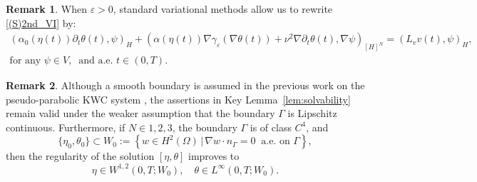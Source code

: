 \documentclass{sinst}
\numberwithin{equation}{section}
\theoremstyle{plain}
\theoremstyle{definition}
\newtheorem{rem}{Remark}
\begin{document}
\begin{rem}
  When $\varepsilon > 0$, standard variational methods allow us to rewrite \eqref{(S)2nd_VI} by:
  \begin{gather}
    (\alpha_0(\eta(t)) \partial_t \theta(t), \psi)_H + (\alpha(\eta(t)) \nabla \gamma_\varepsilon(\nabla \theta(t)) + \nu^2 \nabla \partial_t \theta(t), \nabla \psi)_{[H]^N} = (L_v v(t), \psi)_H,
    \\
    \mbox{for any } \psi \in V, \ \mbox{ and a.e. } t \in (0,T). 
  \end{gather}
\end{rem}

\begin{rem}
  Although a smooth boundary is assumed in the previous work on the pseudo-parabolic KWC system \cite{mizuno2024weak}, the assertions in Key Lemma~\ref{lem:solvability} remain valid under the weaker assumption that the boundary $\Gamma$ is Lipschitz continuous. Furthermore, if $N \in {1,2,3}$, the boundary $\Gamma$ is of class $C^4$, and 
  \begin{equation}
  \{ \eta_0, \theta_0 \} \subset W_0 := \left\{ w \in H^2(\Omega) \,|\, \nabla w \cdot n_\Gamma = 0 \ \mbox{ a.e. on } \Gamma \right\},
  \end{equation}
  then the regularity of the solution $[\eta, \theta]$ improves to
  \begin{equation}
    \eta \in W^{1,2}(0,T; W_0), \quad \theta \in L^\infty(0,T; W_0).
  \end{equation}
\end{rem}
\end{document}
